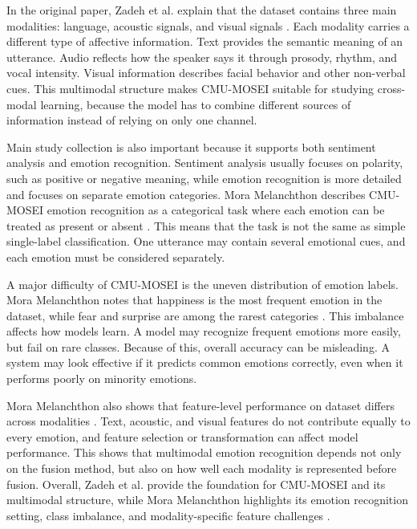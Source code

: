 In the original paper, Zadeh et al. explain that the dataset contains three main modalities: language, acoustic signals, and visual signals \cite{zadeh2018multimodal}. Each modality carries a different type of affective information. Text provides the semantic meaning of an utterance. Audio reflects how the speaker says it through prosody, rhythm, and vocal intensity. Visual information describes facial behavior and other non-verbal cues. This multimodal structure makes CMU-MOSEI suitable for studying cross-modal learning, because the model has to combine different sources of information instead of relying on only one channel.

Main study collection is also important because it supports both sentiment analysis and emotion recognition. Sentiment analysis usually focuses on polarity, such as positive or negative meaning, while emotion recognition is more detailed and focuses on separate emotion categories. Mora Melanchthon describes CMU-MOSEI emotion recognition as a categorical task where each emotion can be treated as present or absent \cite{mora2021unimodal}. This means that the task is not the same as simple single-label classification. One utterance may contain several emotional cues, and each emotion must be considered separately.

A major difficulty of CMU-MOSEI is the uneven distribution of emotion labels. Mora Melanchthon notes that happiness is the most frequent emotion in the dataset, while fear and surprise are among the rarest categories \cite{mora2021unimodal}. This imbalance affects how models learn. A model may recognize frequent emotions more easily, but fail on rare classes. Because of this, overall accuracy can be misleading. A system may look effective if it predicts common emotions correctly, even when it performs poorly on minority emotions.

Mora Melanchthon also shows that feature-level performance on dataset differs across modalities \cite{mora2021unimodal}. Text, acoustic, and visual features do not contribute equally to every emotion, and feature selection or transformation can affect model performance. This shows that multimodal emotion recognition depends not only on the fusion method, but also on how well each modality is represented before fusion. Overall, Zadeh et al. provide the foundation for CMU-MOSEI and its multimodal structure, while Mora Melanchthon highlights its emotion recognition setting, class imbalance, and modality-specific feature challenges \cite{zadeh2018multimodal,mora2021unimodal}.

